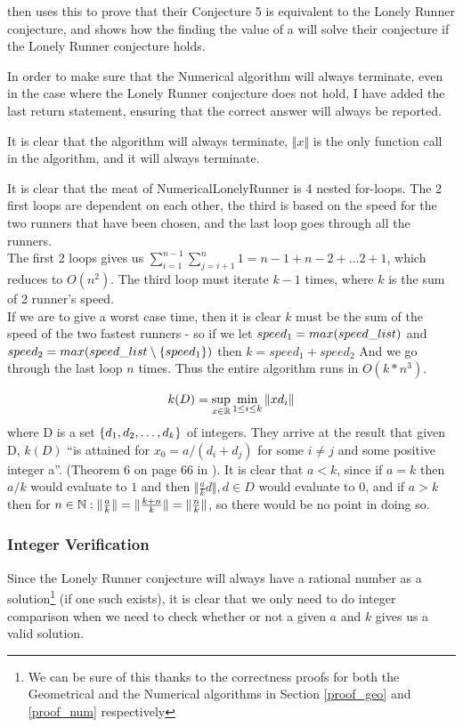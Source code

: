 \cite{invis} then uses this to prove that their Conjecture 5 is equivalent to the Lonely Runner conjecture, and shows how the finding the value of a will solve their conjecture if the Lonely Runner conjecture holds.

In order to make sure that the Numerical algorithm will always terminate, even in the case where the Lonely Runner conjecture does not hold, I have added the last return statement, ensuring that the correct answer will always be reported.

\begin{theo}[Termination:]
It is clear that the algorithm will always terminate, $\Vert x \Vert $ is the only function call in the algorithm, and it will always terminate.
\end{theo}

\begin{theo}
It is clear that the meat of NumericalLonelyRunner is 4 nested for-loops. The 2 first loops are dependent on each other, the third is based on the speed for the two runners that have been chosen, and the last loop goes through all the runners.\\

The first 2 loops gives us $\sum_{i=1}^{n-1}\sum_{j=i+1}^{n}1 = n-1 + n-2 + \ldots 2 + 1$, which reduces to $O(n^2)$. The third loop must iterate $k-1$ times, where $k$ is the sum of 2 runner's speed.\\

If we are to give a worst case time, then it is clear $k$ must be the sum of the speed of the two fastest runners - so if we let $speed_1 = max(speed\_list)$ and $speed_2 = max(speed\_list \setminus \{speed_1\})$ then $k = speed_1 + speed_2$
And we go through the last loop $n$ times. Thus the entire algorithm runs in $O(k * n^3)$.
\end{theo}

$$
k(D) = \sup_{x \in \mathbb{R}}\min_{1 \leq i \leq k}\Vert x d_i \Vert
$$
where D is a set $\{d_1, d_2, \ldots, d_k\}$ of integers. They arrive at the result that given D, $k(D)$ ``is attained for $x_0 = a /(d_i + d_j)$ for some $i \neq j$ and some positive integer a''. (Theorem 6 on page 66 in \cite{invis}). It is clear that $a < k$, since if $a = k$ then $a/k$ would evaluate to $1$ and then $\Vert \frac{a}{k} d\Vert, d \in D$ would evaluate to 0, and if $a > k$ then for $n \in \mathbb{N}: \Vert\frac{a}{k}\Vert = \Vert\frac{k+n}{k}\Vert = \Vert\frac{n}{k}\Vert$, so there would be no point in doing so.

\subsubsection{Integer Verification}
Since the Lonely Runner conjecture will always have a rational number as a solution\footnote{We can be sure of this thanks to the correctness proofs for both the Geometrical and the Numerical algorithms in Section \ref{proof_geo} and \ref{proof_num} respectively} (if one such exists), it is clear that we only need to do integer comparison when we need to check whether or not a given $a$ and $k$ gives us a valid solution.

